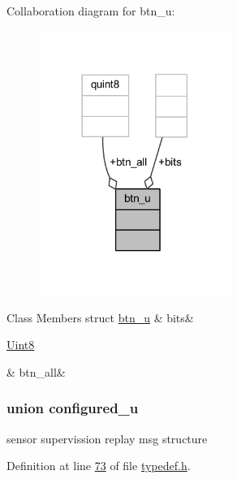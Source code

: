 Collaboration diagram for btn\+\_\+u\+:
\nopagebreak
\begin{figure}[H]
\begin{center}
\leavevmode
\includegraphics[width=177pt]{df/d17/a00231}
\end{center}
\end{figure}
\begin{DoxyFields}{Class Members}
\hypertarget{a00001_a6ce19935fc0d28b418cf95e8153e847e}{struct \hyperlink{a00001_d3/d8b/a00059}{btn\+\_\+u}}\label{a00001_a6ce19935fc0d28b418cf95e8153e847e}
&
bits&
\\
\hline

\hypertarget{a00001_acf5d941837cc185f029d056fc69a60d6}{\hyperlink{a00001_a979e3e23b9a449e69ab6a8a83b6042f8}{Uint8}}\label{a00001_acf5d941837cc185f029d056fc69a60d6}
&
btn\+\_\+all&
\\
\hline

\end{DoxyFields}
\label{df/d03/a00062}
\hypertarget{a00001_df/d03/a00062}{}
\subsubsection{union configured\+\_\+u}
sensor supervission replay msg structure 

Definition at line \hyperlink{a00001_source_l00073}{73} of file \hyperlink{a00001_source}{typedef.\+h}.



